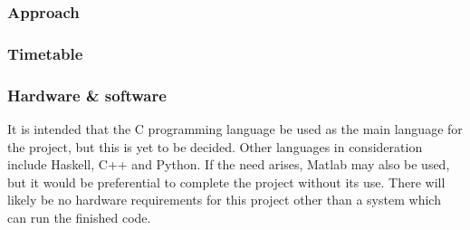 \documentclass{article}
\begin{document}
\subsubsection*{Approach}

\subsubsection*{Timetable}

\begin{gantt}{15}{9}
  \begin{ganttitle}
  \end{ganttitle}
  \begin{ganttitle}
  \end{ganttitle}
\end{gantt}

\subsubsection*{Hardware \& software}

It is intended that the C programming language be used as the main language for the project, but this is yet to be decided. Other languages in consideration include Haskell, C++ and Python. If the need arises, Matlab may also be used, but it would be preferential to complete the project without its use. There will likely be no hardware requirements for this project other than a system which can run the finished code.

\printbibliography
\end{document}
